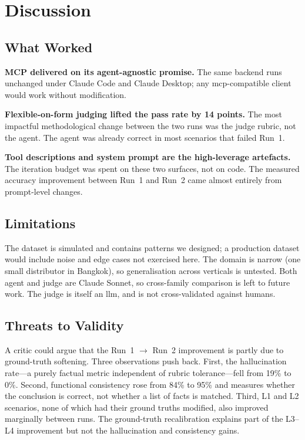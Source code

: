 
\chapter{Discussion}
\label{ch:discussion}

\section{What Worked}

\textbf{MCP delivered on its agent-agnostic promise.} The same backend runs unchanged under Claude Code and Claude Desktop; any \gls{mcp}-compatible client would work without modification.

\textbf{Flexible-on-form judging lifted the pass rate by 14 points.} The most impactful methodological change between the two runs was the judge rubric, not the agent. The agent was already correct in most scenarios that failed Run~1.

\textbf{Tool descriptions and system prompt are the high-leverage artefacts.} The iteration budget was spent on these two surfaces, not on code. The measured accuracy improvement between Run~1 and Run~2 came almost entirely from prompt-level changes.

\section{Limitations}

The dataset is simulated and contains patterns we designed; a production dataset would include noise and edge cases not exercised here. The domain is narrow (one small distributor in Bangkok), so generalisation across verticals is untested. Both agent and judge are Claude Sonnet, so cross-family comparison is left to future work. The judge is itself an \gls{llm}, and is not cross-validated against humans.

\section{Threats to Validity}

A critic could argue that the Run~1 $\to$ Run~2 improvement is partly due to ground-truth softening. Three observations push back. First, the hallucination rate---a purely factual metric independent of rubric tolerance---fell from 19\% to 0\%. Second, functional consistency rose from 84\% to 95\% and measures whether the conclusion is correct, not whether a list of facts is matched. Third, L1 and L2 scenarios, none of which had their ground truths modified, also improved marginally between runs. The ground-truth recalibration explains part of the L3--L4 improvement but not the hallucination and consistency gains.

